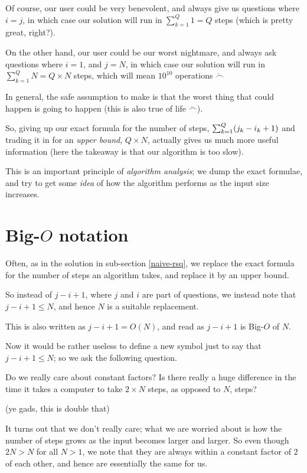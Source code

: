 \documentclass{article}
\DeclarePairedDelimiter{\braces}{(}{)}
\begin{document}
Of course, our user could be very benevolent, and always give us
questions where $i = j$, in which case our solution will run in
$\sum_{k = 1}^Q 1 = Q$ steps (which is pretty great, right?).

On the other hand, our user could be our worst nightmare, and always ask
questions where $i = 1$, and $j = N$, in which case our solution will
run in $\sum_{k = 1}^Q N = Q \times N$ steps, which will mean $10^{10}$
operations $\ddot\smallfrown$

In general, the safe assumption to make is that the worst thing that could
happen is going to happen (this is also true of life $\ddot\smallfrown$).

So, giving up our exact formula for the number of steps, 
$\sum_{k = 1}^Q \braces*{j_k - i_k + 1}$
and trading it in for an \emph{upper bound},
$Q \times N$, actually gives us much more useful information
(here the takeaway is that our algorithm is too slow).

This is an important principle of \emph{algorithm analysis};
we dump the exact formulae, and try to get some \emph{idea}
of how the algorithm performs as the input size increases.

\section{Big-$O$ notation}

Often, as in the solution in sub-section \ref{naive-rsq}, we 
replace the exact formula for the number of steps an algorithm takes,
and replace it by an upper bound.

So instead of $j - i + 1$, where $j$ and $i$ are part of questions,
we instead note that $j - i + 1 \leq N$, and hence $N$ is a suitable
replacement.

This is also written as $j - i + 1 = O(N)$, and read as
$j - i + 1$ is Big-$O$ of $N$.

Now it would be rather useless to define a new symbol just to say that
$j - i + 1 \leq N$; so we ask the following question.

\vspace{1em}

Do we really care about constant factors?
Is there really a huge difference in the time it takes a computer to take
$2\times N$ steps, as opposed to $N$, steps?

(ye gads, this is double that)

It turns out that we don't really care; what we are worried about
is how the number of steps grows as the input becomes larger and larger.
So even though $2N > N$ for all $N > 1$, we note that they are
always within a constant factor of $2$ of each other, and hence
are essentially the same for us.
\end{document}
